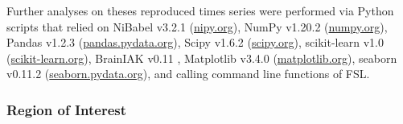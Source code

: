 %
Further analyses on theses reproduced times series were performed via Python
scripts that relied on
%
NiBabel v3.2.1 (\href{https://nipy.org}{\url{nipy.org}}),
%
NumPy v1.20.2 (\href{https://numpy.org}{\url{numpy.org}}),
%
Pandas v1.2.3 (\href{https://pandas.pydata.org}{\url{pandas.pydata.org}}),
%
Scipy v1.6.2 (\href{https://scipy.org}{\url{scipy.org}}),
%
scikit-learn v1.0 (\href{https://scikit-learn.org}{\url{scikit-learn.org}}),
%
BrainIAK v0.11
\citep[\href{https://brainiak.org}{\url{brainiak.org}}][]{kumar2020brainiak,
kumar2020brainiaktutorial},
%
Matplotlib v3.4.0 (\href{https://matplotlib.org}{\url{matplotlib.org}}),
%
seaborn v0.11.2 (\href{https://seaborn.pydata.org}{\url{seaborn.pydata.org}}),
%
and calling command line functions of FSL.








\subsubsection{Region of Interest}


